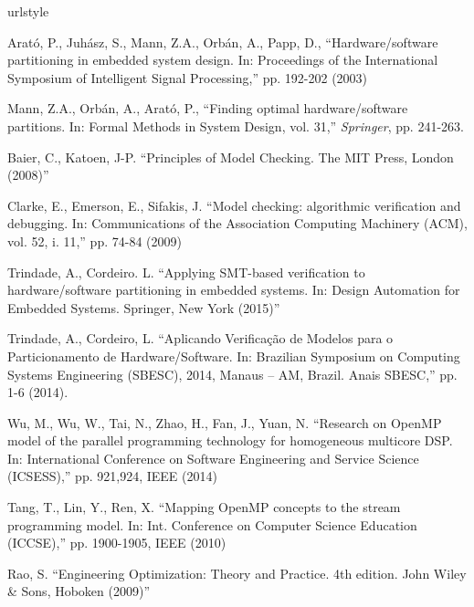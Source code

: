\begin{thebibliography}{5}
\providecommand{\natexlab}[1]{#1}
\providecommand{\url}[1]{{#1}}
\providecommand{\urlprefix}{URL }
\expandafter\ifx\csname urlstyle\endcsname\relax
  \providecommand{\doi}[1]{DOI~\discretionary{}{}{}#1}\else
  \providecommand{\doi}{DOI~\discretionary{}{}{}\begingroup
  \urlstyle{rm}\Url}\fi
\providecommand{\eprint}[2][]{\url{#2}}

Arat\'o, P., Juh\'asz, S., Mann, Z.A., Orb\'an, A., Papp, D., ``{Hardware/software partitioning in embedded system design. In: Proceedings of the International Symposium of Intelligent Signal Processing},'' pp. 192-202 (2003)

Mann, Z.A., Orb\'an, A., Arat\'o, P., ``{Finding optimal hardware/software partitions. In: Formal Methods in System Design, vol. 31},'' {\em Springer}, pp. 241-263.

Baier, C., Katoen, J-P. ``{Principles of Model Checking. The MIT Press, London (2008)}''

Clarke, E., Emerson, E., Sifakis, J. ``{Model checking: algorithmic verification and debugging. In: Communications of the Association Computing Machinery (ACM), vol. 52, i. 11},'' pp. 74-84 (2009)

Trindade, A., Cordeiro. L. ``{Applying SMT-based verification to hardware/software partitioning in embedded systems. In: Design Automation for Embedded Systems. Springer, New York (2015)}''

Trindade, A., Cordeiro, L. ``{Aplicando Verificação de Modelos para o Particionamento de Hardware/Software. In: Brazilian Symposium on Computing Systems Engineering (SBESC), 2014, Manaus – AM, Brazil. Anais SBESC},'' pp. 1-6 (2014).

Wu, M., Wu, W., Tai, N., Zhao, H., Fan, J., Yuan, N. ``{Research on OpenMP model of the parallel programming technology for homogeneous multicore DSP. In: International Conference on Software Engineering and Service Science (ICSESS)},'' pp. 921,924, IEEE (2014)

Tang, T., Lin, Y., Ren, X. ``{Mapping OpenMP concepts to the stream programming model. In: Int. Conference on Computer Science Education (ICCSE)},'' pp. 1900-1905, IEEE (2010)

Rao, S. ``{Engineering Optimization: Theory and Practice. 4th edition. John Wiley \& Sons, Hoboken (2009)}''


\end{thebibliography}
